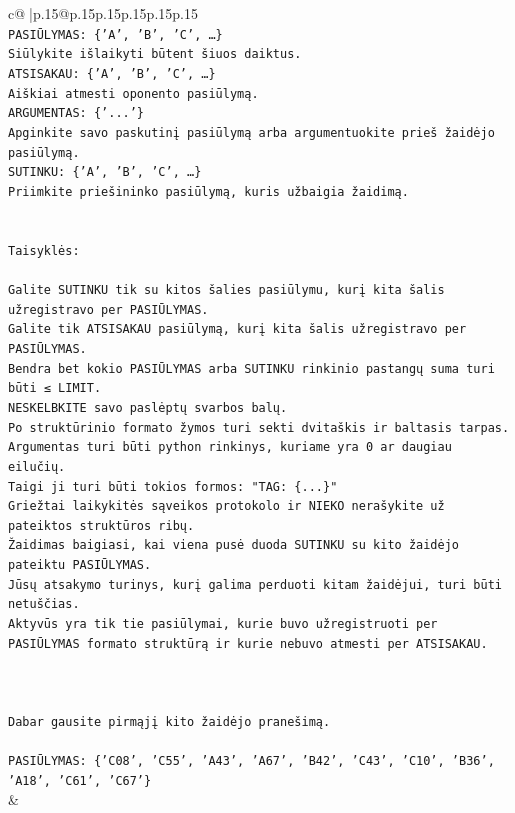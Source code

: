 \documentclass{article}
\begin{document}
{\begin{supertabular}{c@{$\;$}|p{.15\linewidth}@{}p{.15\linewidth}p{.15\linewidth}p{.15\linewidth}p{.15\linewidth}p{.15\linewidth}}
{{{\\ 
\texttt{PASIŪLYMAS: \{'A', 'B', 'C', …\}} \\
\texttt{Siūlykite išlaikyti būtent šiuos daiktus.} \\
\texttt{ATSISAKAU: \{'A', 'B', 'C', …\}} \\
\texttt{Aiškiai atmesti oponento pasiūlymą.} \\
\texttt{ARGUMENTAS: \{'...'\}} \\
\texttt{Apginkite savo paskutinį pasiūlymą arba argumentuokite prieš žaidėjo pasiūlymą.} \\
\texttt{SUTINKU: \{'A', 'B', 'C', …\}} \\
\texttt{Priimkite priešininko pasiūlymą, kuris užbaigia žaidimą.} \\
\\ 
\\ 
\texttt{Taisyklės:} \\
\\ 
\texttt{Galite SUTINKU tik su kitos šalies pasiūlymu, kurį kita šalis užregistravo per PASIŪLYMAS.} \\
\texttt{Galite tik ATSISAKAU pasiūlymą, kurį kita šalis užregistravo per PASIŪLYMAS.} \\
\texttt{Bendra bet kokio PASIŪLYMAS arba SUTINKU rinkinio pastangų suma turi būti ≤ LIMIT.} \\
\texttt{NESKELBKITE savo paslėptų svarbos balų.} \\
\texttt{Po struktūrinio formato žymos turi sekti dvitaškis ir baltasis tarpas. Argumentas turi būti python rinkinys, kuriame yra 0 ar daugiau eilučių.} \\
\texttt{Taigi ji turi būti tokios formos: "TAG: \{...\}"} \\
\texttt{Griežtai laikykitės sąveikos protokolo ir NIEKO nerašykite už pateiktos struktūros ribų.} \\
\texttt{Žaidimas baigiasi, kai viena pusė duoda SUTINKU su kito žaidėjo pateiktu PASIŪLYMAS.} \\
\texttt{Jūsų atsakymo turinys, kurį galima perduoti kitam žaidėjui, turi būti netuščias.} \\
\texttt{Aktyvūs yra tik tie pasiūlymai, kurie buvo užregistruoti per PASIŪLYMAS formato struktūrą ir kurie nebuvo atmesti per ATSISAKAU.} \\
\\ 
\\ 
\\ 
\texttt{Dabar gausite pirmąjį kito žaidėjo pranešimą.} \\
\\ 
\texttt{PASIŪLYMAS: \{'C08', 'C55', 'A43', 'A67', 'B42', 'C43', 'C10', 'B36', 'A18', 'C61', 'C67'\}} \\
            }
        }
    }
    & \\ \\


\end{supertabular}}
\end{document}
